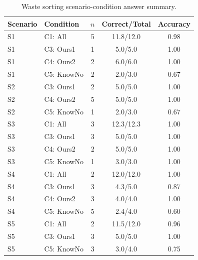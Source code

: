 \begin{table}[h]
\centering
\caption{Waste sorting scenario-condition answer summary.}
\label{tab:app_waste_answer_summary}
\scriptsize
\setlength{\tabcolsep}{4pt}
\begin{tabular}{llccc}
\toprule
\textbf{Scenario} & \textbf{Condition} & \textbf{$n$} & \textbf{Correct/Total} & \textbf{Accuracy} \\
\midrule
S1 & C1: All & 5 & 11.8/12.0 & 0.98 \\
S1 & C3: Ours1 & 1 & 5.0/5.0 & 1.00 \\
S1 & C4: Ours2 & 2 & 6.0/6.0 & 1.00 \\
S1 & C5: KnowNo & 2 & 2.0/3.0 & 0.67 \\
S2 & C3: Ours1 & 2 & 5.0/5.0 & 1.00 \\
S2 & C4: Ours2 & 5 & 5.0/5.0 & 1.00 \\
S2 & C5: KnowNo & 1 & 2.0/3.0 & 0.67 \\
S3 & C1: All & 3 & 12.3/12.3 & 1.00 \\
S3 & C3: Ours1 & 3 & 5.0/5.0 & 1.00 \\
S3 & C4: Ours2 & 2 & 5.0/5.0 & 1.00 \\
S3 & C5: KnowNo & 1 & 3.0/3.0 & 1.00 \\
S4 & C1: All & 2 & 12.0/12.0 & 1.00 \\
S4 & C3: Ours1 & 3 & 4.3/5.0 & 0.87 \\
S4 & C4: Ours2 & 3 & 4.0/4.0 & 1.00 \\
S4 & C5: KnowNo & 5 & 2.4/4.0 & 0.60 \\
S5 & C1: All & 2 & 11.5/12.0 & 0.96 \\
S5 & C3: Ours1 & 3 & 5.0/5.0 & 1.00 \\
S5 & C5: KnowNo & 3 & 3.0/4.0 & 0.75 \\
\bottomrule
\end{tabular}
\end{table}
